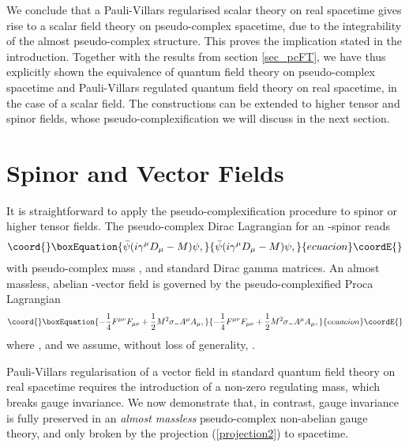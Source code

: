 \documentclass[a4paper,aps,prd,showkeys,showpacs,superscriptaddress,preprint]{revtex4}
\providecommand{\pc}{\mathbb{P}}
\begin{document}
We conclude that a Pauli-Villars regularised scalar theory on real spacetime
gives rise to a scalar field theory on pseudo-complex spacetime, due
to the integrability of the almost pseudo-complex structure.
This proves the implication \coordHE{} stated in the
introduction. Together with the results from section \ref{sec_pcFT},
we have thus explicitly shown the equivalence of quantum field theory on
pseudo-complex spacetime and Pauli-Villars regulated quantum field
theory on real spacetime, in the case of a scalar
field. The constructions can be extended to higher
tensor and spinor fields, whose pseudo-complexification we will discuss
in the next section.

\section{Spinor and Vector Fields\label{sec_gaugetheory}}
It is straightforward to apply the pseudo-complexification
procedure to spinor or higher tensor fields. The pseudo-complex Dirac
Lagrangian for an \myHighlight{$SO_\pc(1,3)$}\coordHE{}-spinor \myHighlight{$\psi$}\coordHE{} reads
\begin{equation}\coord{}\boxEquation{
  \bar \psi(i \gamma^\mu D_\mu - M) \psi,
}{
  \bar \psi(i \gamma^\mu D_\mu - M) \psi,
}{ecuacion}\coordE{}\end{equation}
with pseudo-complex mass \coordHE{}, and standard Dirac gamma
matrices. An almost massless, abelian \myHighlight{$SO_\pc(1,3)$}\coordHE{}-vector field
\coordHE{} is governed by the pseudo-complexified Proca Lagrangian
\begin{equation}\coord{}\boxEquation{
  -\frac{1}{4} F^{\mu\nu}F_{\mu\nu} + \frac{1}{2} M^2 \sigma_- A^\mu A_\mu,
}{
  -\frac{1}{4} F^{\mu\nu}F_{\mu\nu} + \frac{1}{2} M^2 \sigma_- A^\mu A_\mu,
}{ecuacion}\coordE{}\end{equation} 
where \coordHE{}, and we assume,
without loss of generality, \myHighlight{$M \in \pc^0_-$}\coordHE{}. 

Pauli-Villars regularisation of a vector field in standard quantum
field theory on real spacetime requires the introduction of a non-zero
regulating mass, which breaks gauge invariance. 
We now demonstrate that, in contrast, gauge invariance is fully
preserved in an \textsl{almost massless} pseudo-complex non-abelian gauge theory,
and only broken by the projection (\ref{projection2}) to spacetime.
\end{document}
